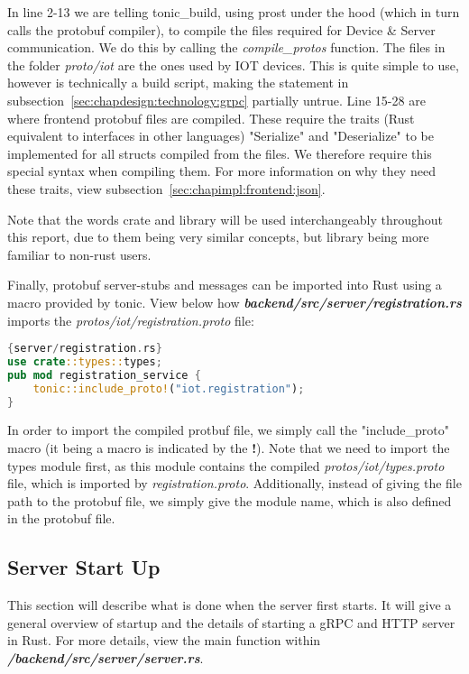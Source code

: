 In line 2-13 we are telling tonic\_build, using prost under the hood (which in turn calls the protobuf compiler), to compile the files required for Device \& Server communication. We do this by calling the \textit{compile\_protos} function. The files in the folder \textit{proto/iot} are the ones used by IOT devices. This is quite simple to use, however is technically a build script, making the statement in subsection~\ref{sec:chapdesign:technology:grpc} partially untrue. Line 15-28 are where frontend protobuf files are compiled. These require the traits (Rust equivalent to interfaces in other languages) "Serialize" and "Deserialize" to be implemented for all structs compiled from the files. We therefore require this special syntax when compiling them. For more information on why they need these traits, view subsection~\ref{sec:chapimpl:frontend:json}.

Note that the words crate and library will be used interchangeably throughout this report, due to them being very similar concepts, but library being more familiar to non-rust users.

Finally, protobuf server-stubs and messages can be imported into Rust using a macro provided by tonic. View below how \textbf{\textit{backend/src/server/registration.rs}} imports the \textit{protos/iot/registration.proto} file:

\begin{lstlisting}[language=Rust, style=boxed]{server/registration.rs}
use crate::types::types;
pub mod registration_service {
    tonic::include_proto!("iot.registration");
}
\end{lstlisting}

In order to import the compiled protbuf file, we simply call the "include\_proto" macro (it being a macro is indicated by the \textbf{!}). Note that we need to import the types module first, as this module contains the compiled \textit{protos/iot/types.proto} file, which is imported by \textit{registration.proto}. Additionally, instead of giving the file path to the protobuf file, we simply give the module name, which is also defined in the protobuf file.

\subsection{Server Start Up} \label{sec:chapimpl:server:startup}
This section will describe what is done when the server first starts. It will give a general overview of startup and the details of starting a gRPC and HTTP server in Rust. For more details, view the main function within \textit{\textbf{/backend/src/server/server.rs}}.

